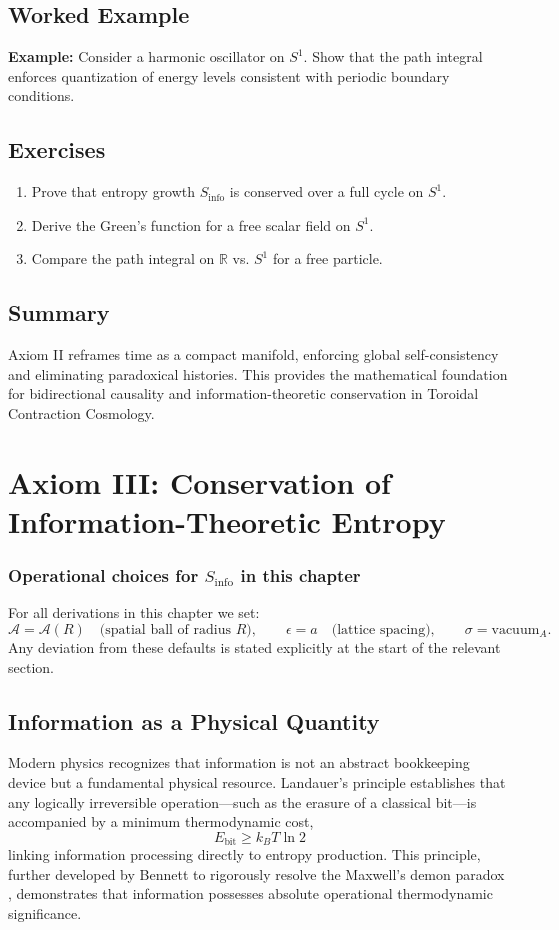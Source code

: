 \documentclass[12pt,openany]{book}
\theoremstyle{plain}
\theoremstyle{definition}
\theoremstyle{remark}
\begin{document}
\section{Worked Example}
\textbf{Example:} Consider a harmonic oscillator on $S^1$. Show that the path integral enforces quantization of energy levels consistent with periodic boundary conditions.

\section{Exercises}
\begin{enumerate}
    \item Prove that entropy growth $S_{\text{info}}$ is conserved over a full cycle on $S^1$.
    \item Derive the Green’s function for a free scalar field on $S^1$.
    \item Compare the path integral on $\mathbb{R}$ vs. $S^1$ for a free particle.
\end{enumerate}

\section{Summary}
Axiom II reframes time as a compact manifold, enforcing global self-consistency
and eliminating paradoxical histories. This provides the mathematical foundation
for bidirectional causality and information-theoretic conservation in Toroidal
Contraction Cosmology.

\chapter{Axiom III: Conservation of Information-Theoretic Entropy}

\subsection*{Operational choices for $S_{\mathrm{info}}$ in this chapter}
For all derivations in this chapter we set:
\[
\mathcal{A}=\mathcal{A}(R)\quad\text{(spatial ball of radius $R$)},\qquad
\epsilon=a\quad\text{(lattice spacing)},\qquad
\sigma=\text{vacuum}_A.
\]
Any deviation from these defaults is stated explicitly at the start of the relevant section.

\section{Information as a Physical Quantity}
Modern physics recognizes that information is not an abstract bookkeeping device but a fundamental physical resource. Landauer's principle \cite{landauer1961} establishes that any logically irreversible operation---such as the erasure of a classical bit---is accompanied by a minimum thermodynamic cost,
\[
E_{\mathrm{bit}} \ge k_{B} T \ln 2
\]
linking information processing directly to entropy production. This principle, further developed by Bennett to rigorously resolve the Maxwell's demon paradox \cite{bennett1982}, demonstrates that information possesses absolute operational thermodynamic significance.
\end{document}
